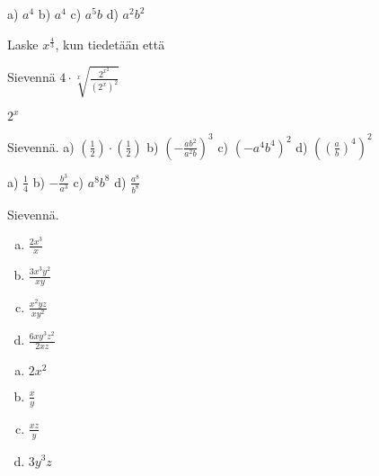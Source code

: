 \begin{tehtavasivu}
\begin{tehtava}
        \begin{vastaus}
            a) $a^4$ 
            b) $a^4$ 
            c) $a^5b$ 
            d) $a^2b^2$
        \end{vastaus}
    \end{tehtava}

    \begin{tehtava}
Laske $x^{\frac{4}{3}}$, kun tiedetään että
    \begin{alakohdat}
     \end{alakohdat}
\begin{vastaus}
\begin{alakohdat}
\end{alakohdat}
\end{vastaus}
    \end{tehtava}
 
 \begin{tehtava}
Sievennä 
$4 \cdot \sqrt[x]{\frac{2^{x^2}}{(2^x)^2}}$
\begin{vastaus}
$2^x$
\end{vastaus}

 \end{tehtava}

 \begin{tehtava}
        Sievennä. 
        a) $(\frac{1}{2})\cdot(\frac{1}{2})$ 
        b) $(-\frac{ab^2}{a^2b})^3$ 
        c) $(-a^4b^4)^2$ 
        d) $\left((\frac{a}{b})^4\right)^2$
        
        \begin{vastaus}
            a) $\frac{1}{4}$ 
            b) $-\frac{b^3}{a^3}$ 
            c) $a^8b^8$ 
            d) $\frac{a^8}{b^8}$
        \end{vastaus}
    \end{tehtava}
\begin{tehtava}
Sievennä.
	\begin{enumerate}[a)]
	\item $\frac{2x^3}{x}$
	\item $\frac{3x^3y^2}{xy}$
	\item $\frac{x^2yz}{xy^2}$
	\item $\frac{6xy^3z^2}{2xz}$
	\end{enumerate}

\begin{vastaus}
	\begin{enumerate}[a)]
	\item $2x^2$
	\item $\frac{x}{y}$
	\item $\frac{xz}{y}$
	\item $3y^3z$
	\end{enumerate}
\end{vastaus}
\end{tehtava}


\end{tehtavasivu}
